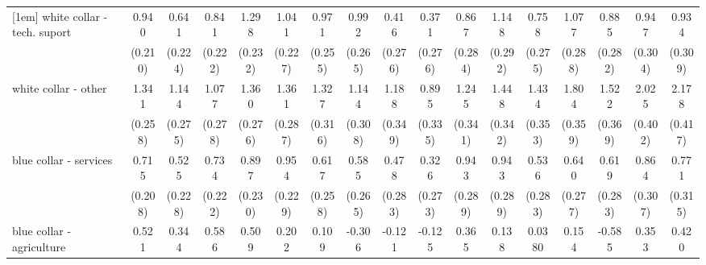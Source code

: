 {\begin{tabular}{l*{16}{c}}
[1em]
white collar - tech. suport&       0.940\sym{***}&       0.641\sym{**} &       0.841\sym{***}&       1.298\sym{***}&       1.041\sym{***}&       0.971\sym{***}&       0.992\sym{***}&       0.416         &       0.371         &       0.867\sym{**} &       1.148\sym{***}&       0.758\sym{**} &       1.077\sym{***}&       0.885\sym{**} &       0.947\sym{**} &       0.934\sym{**} \\
                    &     (0.210)         &     (0.224)         &     (0.222)         &     (0.232)         &     (0.227)         &     (0.255)         &     (0.265)         &     (0.276)         &     (0.276)         &     (0.284)         &     (0.292)         &     (0.275)         &     (0.288)         &     (0.282)         &     (0.304)         &     (0.309)         \\
[1em]
white collar - other&       1.341\sym{***}&       1.144\sym{***}&       1.077\sym{***}&       1.360\sym{***}&       1.361\sym{***}&       1.327\sym{***}&       1.144\sym{***}&       1.188\sym{***}&       0.895\sym{**} &       1.245\sym{***}&       1.448\sym{***}&       1.434\sym{***}&       1.804\sym{***}&       1.522\sym{***}&       2.025\sym{***}&       2.178\sym{***}\\
                    &     (0.258)         &     (0.275)         &     (0.278)         &     (0.276)         &     (0.287)         &     (0.316)         &     (0.308)         &     (0.349)         &     (0.335)         &     (0.341)         &     (0.342)         &     (0.353)         &     (0.359)         &     (0.369)         &     (0.402)         &     (0.417)         \\
[1em]
blue collar - services&       0.715\sym{***}&       0.525\sym{*}  &       0.734\sym{***}&       0.897\sym{***}&       0.954\sym{***}&       0.617\sym{*}  &       0.585\sym{*}  &       0.478         &       0.326         &       0.943\sym{**} &       0.943\sym{**} &       0.536         &       0.640\sym{*}  &       0.619\sym{*}  &       0.864\sym{**} &       0.771\sym{*}  \\
                    &     (0.208)         &     (0.228)         &     (0.222)         &     (0.230)         &     (0.229)         &     (0.258)         &     (0.265)         &     (0.283)         &     (0.273)         &     (0.289)         &     (0.289)         &     (0.283)         &     (0.277)         &     (0.283)         &     (0.307)         &     (0.315)         \\
[1em]
blue collar - agriculture&       0.521         &       0.344         &       0.586         &       0.509         &       0.202         &       0.109         &      -0.306         &      -0.121         &      -0.125         &       0.365         &       0.138         &      0.0380         &       0.154         &      -0.585         &       0.353         &       0.420         \\

\end{tabular}}
